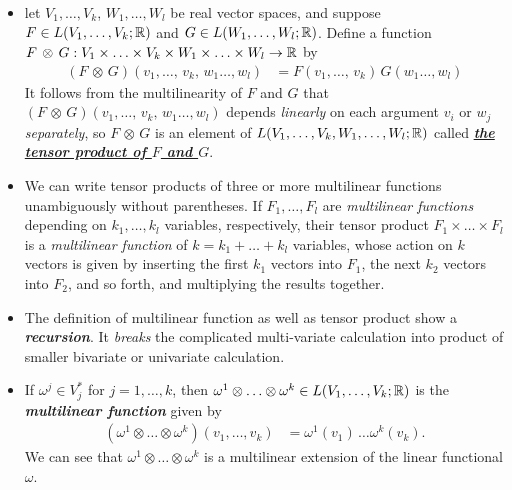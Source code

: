 \documentclass[11pt]{article}
\begin{document}
\begin{itemize}
\item \begin{definition}
let $V_1,\ldots,V_k$, $W_1,\ldots,W_l$ be real vector spaces, and suppose $F \in L(V_1,\ldots,V_k ; {\mathbb R})$ and $G \in L(W_1,\ldots,W_l; {\mathbb R})$. Define a function
$F\, \otimes \, G: V_1\times \ldots \times V_k \times W_1\times \ldots \times W_l \rightarrow {\mathbb R}$
by
\begin{align}
(F\, \otimes \, G)(v_1,\ldots,\,v_k,\,w_1 \ldots, w_l)&= F(v_1,\ldots,\,v_k)\,G(w_1 \ldots, w_l) \label{eqn: tensor_product}
\end{align} It follows from the multilinearity of $F$ and $G$ that $(F\, \otimes \, G)(v_1,\ldots,\,v_k,\,w_1 \ldots, w_l)$ depends \emph{linearly} on each argument $v_i$ or $w_j$ \emph{separately}, so $F\, \otimes \, G$ is an element of $L(V_1,\ldots,V_k, W_1,\ldots,W_l; {\mathbb R})$ called \underline{\emph{\textbf{the tensor product of $F$ and $G$}}}.
\end{definition}

\item \begin{remark}
We can write tensor products of three or more multilinear functions unambiguously without parentheses. If $F_1,\ldots,F_l$ are \emph{multilinear functions} depending on $k_1, \ldots, k_l$ variables, respectively, their tensor product $F_1 \times \ldots \times F_l$ is a \emph{multilinear function} of $k= k_1+ \ldots + k_l$ variables, whose action on $k$ vectors is given by inserting the first $k_1$ vectors into $F_1$, the next $k_2$ vectors into $F_2$, and so forth, and multiplying the results together. 
\end{remark}

\item \begin{remark}
The definition of multilinear function as well as tensor product show a \emph{\textbf{recursion}}. It \emph{breaks} the complicated multi-variate calculation into product of smaller bivariate or univariate calculation. 
\end{remark}

\item \begin{remark}
If $\omega^j \in V_{j}^{*}$ for $j = 1,\ldots,k$, then $\omega^1\otimes \ldots \otimes \omega^k \in L(V_1,\ldots,V_k ; {\mathbb R})$ is the \emph{\textbf{multilinear function}} given by
\begin{align}
(\omega^1\otimes \ldots \otimes \omega^k)(v_1, \ldots, v_k)&= \omega^1(v_1)\,\ldots \omega^{k}(v_k).  \label{eqn: tensor_product_functionals}
\end{align} We can see that $\omega^1\otimes \ldots \otimes \omega^k$ is a multilinear extension of the linear functional $\omega$.
\end{remark}


\end{itemize}
\end{document}
